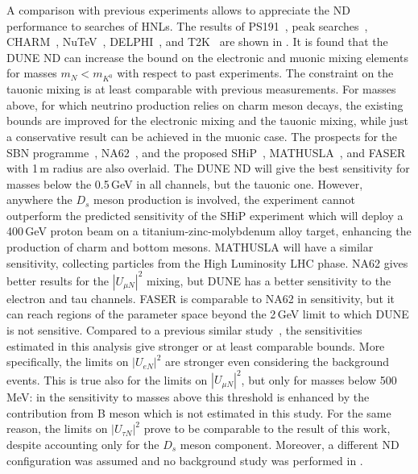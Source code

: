 A comparison with previous experiments allows to appreciate the ND performance to searches of HNLs.
The results of PS191~\cite{Bernardi:1985ny, Bernardi:1987ek}, peak searches~\cite{Artamonov:2014urb, Britton:1992pg, Britton:1992xv}, %
CHARM~\cite{Vilain:1994vg}, NuTeV~\cite{Vaitaitis:1999wq}, DELPHI~\cite{Abreu:1996pa}, and T2K~\cite{Abe:2019kgx} are shown %
in .
It is found that the DUNE ND can increase the bound on the electronic and muonic mixing elements %
for masses $m_N < m_{K^0}$ with respect to past experiments.
The constraint on the tauonic mixing is at least comparable with previous measurements.
For masses above, for which neutrino production relies on charm meson decays, the existing bounds %
are improved for the electronic mixing and the tauonic mixing, while just a conservative result %
can be achieved in the muonic case.
The prospects for the SBN programme~\cite{Ballett:2016opr}, %
NA62~\cite{Drewes:2018irr}, and the proposed SHiP~\cite{Alekhin:2015byh}, MATHUSLA~\cite{Curtin:2018mvb}, %
and FASER~\cite{Kling:2018wct} with 1\,m radius are also overlaid.
The DUNE ND will give the best sensitivity for masses below the 0.5\,GeV in all channels, but the tauonic one.
However, anywhere the $D_s$ meson production is involved, the experiment cannot outperform the predicted %
sensitivity of the SHiP experiment which will deploy a 400\,GeV proton beam on a titanium-zinc-molybdenum alloy %
target, enhancing the production of charm and bottom mesons.
MATHUSLA will have a similar sensitivity, collecting particles from the High Luminosity LHC phase.
NA62 gives better results for the $|U_{\mu N}|^2$ mixing, but DUNE has a better sensitivity %
to the electron and tau channels.
FASER is comparable to NA62 in sensitivity, but it can reach regions of the parameter space beyond the 2\,GeV limit %
to which DUNE is not sensitive.
Compared to a previous similar study~\cite{Krasnov:2019kdc}, %
the sensitivities estimated in this analysis give stronger or at least comparable bounds.
More specifically, the limits on $|U_{eN}|^2$ are stronger even considering the background events.
This is true also for the limits on $|U_{\mu N}|^2$, but only for masses below 500 MeV: %
in  the sensitivity to masses above this threshold is enhanced by the contribution %
from B meson which is not estimated in this study.
For the same reason, the limits on $|U_{\tau N}|^2$ prove to be comparable to the result of this work, %
despite accounting only for the $D_s$ meson component.
Moreover, a different ND configuration was assumed and no background study was performed in .

